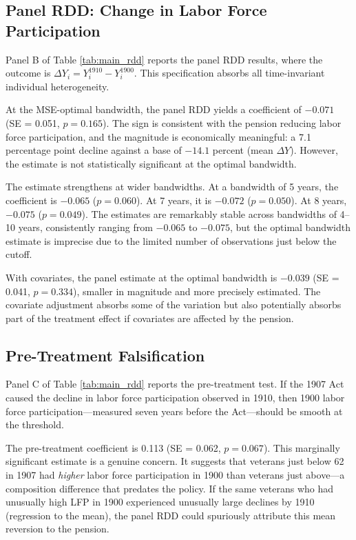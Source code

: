 \documentclass[12pt]{article}
\begin{document}


\subsection{Panel RDD: Change in Labor Force Participation}

Panel B of Table \ref{tab:main_rdd} reports the panel RDD results, where the outcome is $\Delta Y_i = Y_i^{1910} - Y_i^{1900}$. This specification absorbs all time-invariant individual heterogeneity.

At the MSE-optimal bandwidth, the panel RDD yields a coefficient of $-0.071$ (SE = 0.051, $p = 0.165$). The sign is consistent with the pension reducing labor force participation, and the magnitude is economically meaningful: a 7.1 percentage point decline against a base of $-14.1$ percent (mean $\Delta Y$). However, the estimate is not statistically significant at the optimal bandwidth.

The estimate strengthens at wider bandwidths. At a bandwidth of 5 years, the coefficient is $-0.065$ ($p = 0.060$). At 7 years, it is $-0.072$ ($p = 0.050$). At 8 years, $-0.075$ ($p = 0.049$). The estimates are remarkably stable across bandwidths of 4--10 years, consistently ranging from $-0.065$ to $-0.075$, but the optimal bandwidth estimate is imprecise due to the limited number of observations just below the cutoff.

With covariates, the panel estimate at the optimal bandwidth is $-0.039$ (SE = 0.041, $p = 0.334$), smaller in magnitude and more precisely estimated. The covariate adjustment absorbs some of the variation but also potentially absorbs part of the treatment effect if covariates are affected by the pension.

\subsection{Pre-Treatment Falsification}

Panel C of Table \ref{tab:main_rdd} reports the pre-treatment test. If the 1907 Act caused the decline in labor force participation observed in 1910, then 1900 labor force participation---measured seven years before the Act---should be smooth at the threshold.

The pre-treatment coefficient is 0.113 (SE = 0.062, $p = 0.067$). This marginally significant estimate is a genuine concern. It suggests that veterans just below 62 in 1907 had \textit{higher} labor force participation in 1900 than veterans just above---a composition difference that predates the policy. If the same veterans who had unusually high LFP in 1900 experienced unusually large declines by 1910 (regression to the mean), the panel RDD could spuriously attribute this mean reversion to the pension.
\end{document}

